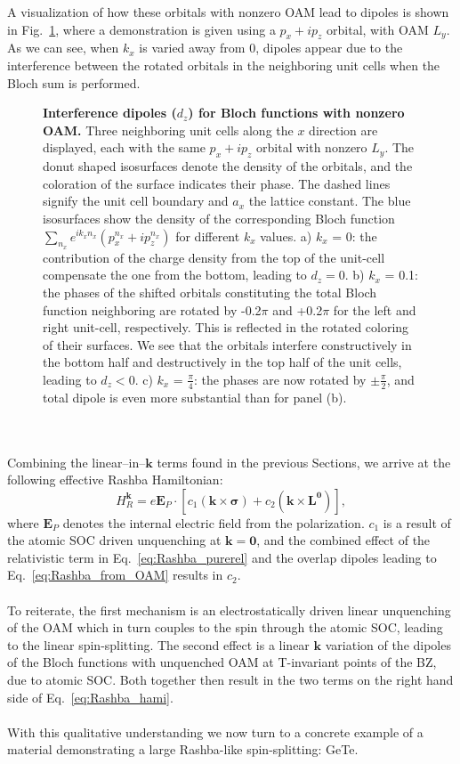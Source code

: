 A visualization of how these orbitals with nonzero OAM lead to dipoles is shown in Fig.~\ref{fig:Rashba_interference}, where a demonstration is given using a $p_x + i p_z$ orbital, with OAM $L_y$.
As we can see, when $k_x$ is varied away from 0, dipoles appear due to the interference between the rotated orbitals in the neighboring unit cells when the Bloch sum is performed.
\begin{figure}
	\centering
{}
\caption{\label{fig:Rashba_interference}{\bf Interference dipoles ($d_z$) for Bloch functions with nonzero OAM.} Three neighboring unit cells along the $x$ direction are displayed, each with the same $p_x + ip_z$ orbital with nonzero $L_y$. The donut shaped isosurfaces denote the density of the orbitals, and the coloration of the surface indicates their phase. The dashed lines signify the unit cell boundary and $a_x$ the lattice constant. The blue isosurfaces show the density of the corresponding Bloch function $\sum_{n_x} e^{i k_x n_x} (p_x^{n_x} + ip_z^{n_x})$ for different $k_x$ values.
a) $k_x$ = 0: the contribution of the charge density from the top of the unit-cell compensate the one from the bottom, leading to $d_z=0$.
b) $k_x$ = 0.1: the phases of the shifted orbitals constituting the total Bloch function neighboring are rotated by -0.2$\pi$ and +0.2$\pi$ for the left and right unit-cell, respectively. This is reflected in the rotated coloring of their surfaces. We see that the orbitals interfere constructively in the bottom half and destructively in the top half of the unit cells, leading to $d_z<0$.
c) $k_x$ = $\frac{\pi}{4}$: the phases are now rotated by $\pm \frac{\pi}{2}$, and total dipole is even more substantial than for panel (b).}
\end{figure}
\\\\
Combining the linear--in--$\bm k$ terms found in the previous Sections, we arrive at the following effective Rashba Hamiltonian:
\begin{equation}
	\label{eq:Rashba_hami}
	H_R^{\bm k} = e \bm{E}_P\cdot \left[c_1(\bm k \times \bm \sigma) + c_2 (\bm k \times \bm{L}^{\bm 0} ) \right],
\end{equation}
where $\bm{E}_P$ denotes the internal electric field from the polarization.
$c_1$ is a result of the atomic SOC driven unquenching at $\bm k = \bm 0$, and the combined effect of the relativistic term in Eq.~\eqref{eq:Rashba_purerel} and the overlap dipoles leading to Eq.~\eqref{eq:Rashba_from_OAM} results in $c_2$.
\\\\
To reiterate, the first mechanism is an electrostatically driven linear unquenching of the OAM which in turn couples to the spin through the atomic SOC, leading to the linear spin-splitting.
The second effect is a linear $\bm k$ variation of the dipoles of the Bloch functions with unquenched OAM at T-invariant points of the BZ, due to atomic SOC. Both together then result in the two terms on the right hand side of Eq.~\eqref{eq:Rashba_hami}. 
\\\\
With this qualitative understanding we now turn to a concrete example of a material demonstrating a large Rashba-like spin-splitting: GeTe.

